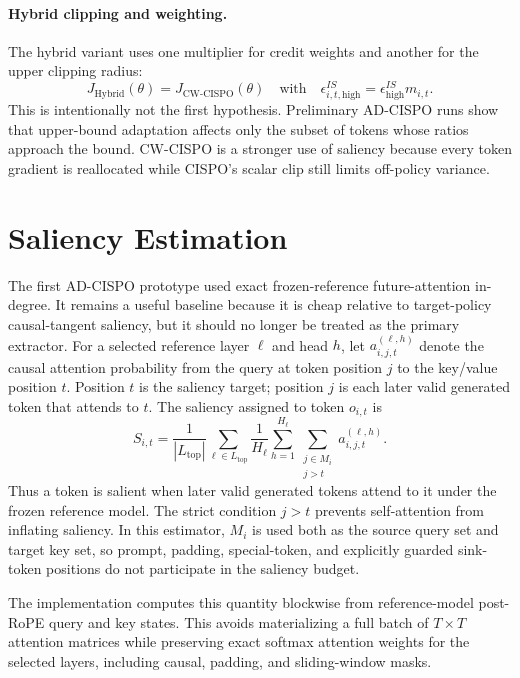 \documentclass[11pt]{article}
\begin{document}
\paragraph{Hybrid clipping and weighting.}
The hybrid variant uses one multiplier for credit weights and another for the
upper clipping radius:
\begin{equation}
  J_{\mathrm{Hybrid}}(\theta)
  =
  J_{\mathrm{CW\mbox{-}CISPO}}(\theta)
  \quad \text{with} \quad
  \epsilon^{IS}_{i,t,\mathrm{high}}
  =
  \epsilon^{IS}_{\mathrm{high}}m_{i,t}.
\end{equation}
This is intentionally not the first hypothesis. Preliminary AD-CISPO runs show
that upper-bound adaptation affects only the subset of tokens whose ratios
approach the bound. CW-CISPO is a stronger use of saliency because every token
gradient is reallocated while CISPO's scalar clip still limits off-policy
variance.

\section{Saliency Estimation}

The first AD-CISPO prototype used exact frozen-reference future-attention
in-degree. It remains a useful baseline because it is cheap relative to
target-policy causal-tangent saliency, but it should no longer be treated as
the primary extractor. For a selected reference layer $\ell$ and head $h$, let
$a^{(\ell,h)}_{i,j,t}$ denote the causal attention probability from the query at
token position $j$ to the key/value position $t$. Position $t$ is the saliency
target; position $j$ is each later valid generated token that attends to $t$.
The saliency assigned to token $o_{i,t}$ is
\begin{equation}
  S_{i,t}
  =
  \frac{1}{|L_{\mathrm{top}}|}
  \sum_{\ell \in L_{\mathrm{top}}}
  \frac{1}{H_\ell}
  \sum_{h=1}^{H_\ell}
  \sum_{\substack{j \in M_i \\ j > t}}
  a^{(\ell,h)}_{i,j,t}.
\end{equation}
Thus a token is salient when later valid generated tokens attend to it under
the frozen reference model. The strict condition $j>t$ prevents self-attention
from inflating saliency. In this estimator, $M_i$ is used both as the source
query set and target key set, so prompt, padding, special-token, and explicitly
guarded sink-token positions do not participate in the saliency budget.

The implementation computes this quantity blockwise from reference-model
post-RoPE query and key states. This avoids materializing a full batch of
$T \times T$ attention matrices while preserving exact softmax attention
weights for the selected layers, including causal, padding, and sliding-window
masks.
\end{document}
